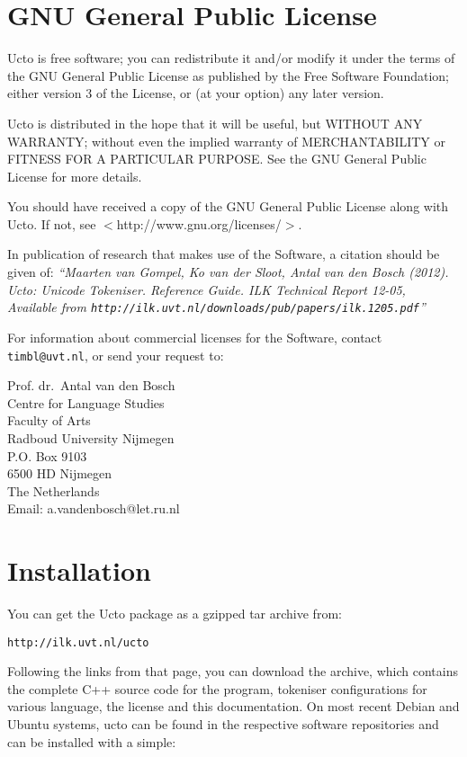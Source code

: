 \documentclass[a4paper,12pt]{report}
\begin{document}
\chapter{GNU General Public License}
\label{license}

Ucto is free software; you can redistribute it and/or modify it under the terms of the GNU General Public License as published by the Free
Software Foundation; either version 3 of the License, or (at your option) any later version.

Ucto is distributed in the hope that it will be useful, but WITHOUT ANY WARRANTY; without even the implied warranty of MERCHANTABILITY or FITNESS FOR A PARTICULAR PURPOSE.  See the GNU General Public License for more details.

You should have received a copy of the GNU General Public License along with Ucto.  If not, see $<$http://www.gnu.org/licenses/$>$.

In publication of research that makes use of the Software, a citation should be given of: {\em ``Maarten van Gompel, Ko van der Sloot, Antal van den Bosch (2012). Ucto: Unicode Tokeniser. Reference Guide. ILK Technical Report 12-05, \\ Available from {\tt http://ilk.uvt.nl/downloads/pub/papers/ilk.1205.pdf}''}

For information about commercial licenses for the Software, contact {\tt timbl@uvt.nl}, or send your request to:

{\footnotesize
Prof. dr.~Antal van den Bosch\\
Centre for Language Studies\\
Faculty of Arts \\
Radboud University Nijmegen \\
P.O. Box 9103 \\
6500 HD Nijmegen \\ 
The Netherlands \\
Email: a.vandenbosch@let.ru.nl}
 
\pagestyle{headings}

\chapter{Installation}
\vspace{-1cm}


You can get the Ucto package as a gzipped tar archive from:

{\tt http://ilk.uvt.nl/ucto}

Following the links from that page, you can download the archive, which contains the complete C++ source code for the program, tokeniser configurations for various language, the license and this documentation. On most recent Debian and Ubuntu systems, ucto can be found in the respective software repositories and can be installed with a simple:
\end{document}
